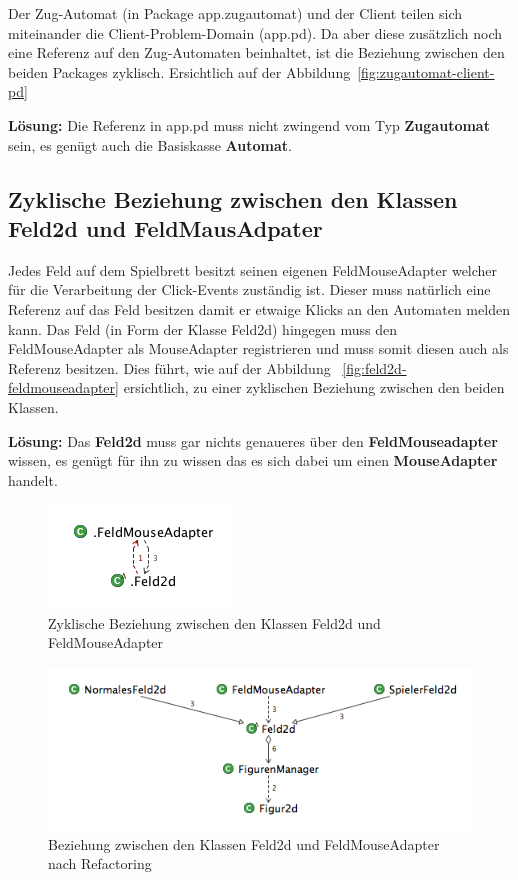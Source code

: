 \documentclass[12pt,halfparskip]{scrartcl}
\begin{document}
Der Zug-Automat (in Package app.zugautomat) und der Client teilen sich miteinander die Client-Problem-Domain (app.pd). Da aber diese zusätzlich noch eine Referenz auf den Zug-Automaten beinhaltet, ist die Beziehung zwischen den beiden Packages zyklisch. Ersichtlich auf der Abbildung~\vref{fig:zugautomat-client-pd}

\textbf{Lösung:} Die Referenz in app.pd muss nicht zwingend vom Typ \textbf{Zugautomat} sein, es genügt auch die Basiskasse \textbf{Automat}.

\subsection{Zyklische Beziehung zwischen den Klassen Feld2d und FeldMausAdpater}

Jedes Feld auf dem Spielbrett besitzt seinen eigenen FeldMouseAdapter welcher für die Verarbeitung der Click-Events zuständig ist. Dieser muss natürlich eine Referenz auf das Feld besitzen damit er etwaige Klicks an den Automaten melden kann. Das Feld (in Form der Klasse Feld2d) hingegen muss den FeldMouseAdapter als MouseAdapter registrieren und muss somit diesen auch als Referenz besitzen. Dies führt, wie auf der Abbildung ~\vref{fig:feld2d-feldmouseadapter} ersichtlich, zu einer zyklischen Beziehung zwischen den beiden Klassen.

\textbf{Lösung:} Das \textbf{Feld2d} muss gar nichts genaueres über den \textbf{FeldMouseadapter} wissen, es genügt für ihn zu wissen das es sich dabei um einen \textbf{MouseAdapter} handelt.

\begin{figure}[H]
	\centering
	\includegraphics[width=0.3 \textwidth]{../design/probleme/feld2d-feldmouseadapter}
	\caption{Zyklische Beziehung zwischen den Klassen Feld2d und FeldMouseAdapter}
	\label{fig:feld2d-feldmouseadapter}
\end{figure}

\begin{figure}[H]
	\centering
	\includegraphics[width=0.8 \textwidth]{../design/probleme/feld2d-feldmouseadapter-nachher}
	\caption{Beziehung zwischen den Klassen Feld2d und FeldMouseAdapter nach Refactoring}
	\label{fig:feld2d-feldmouseadapter-nachher}
\end{figure}
\end{document}
